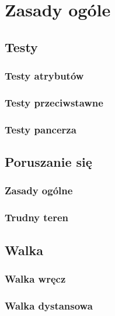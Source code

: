 \chapter{Zasady ogóle}

\section{Testy}
\subsection{Testy atrybutów}
\subsection{Testy przeciwstawne}
\subsection{Testy pancerza}

\section{Poruszanie się}
\subsection{Zasady ogólne}
\subsection{Trudny teren}

\section{Walka}
\subsection{Walka wręcz}
\subsection{Walka dystansowa}




